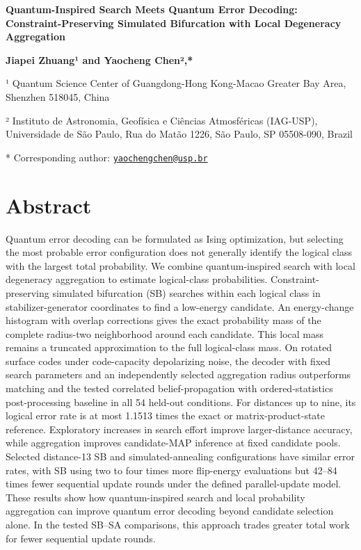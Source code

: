 \documentclass[
  10pt,
]{article}
\author{}
\date{}
\begin{document}
\begin{center}
{\LARGE\bfseries Quantum-Inspired Search Meets Quantum Error Decoding:
Constraint-Preserving Simulated Bifurcation with Local Degeneracy
Aggregation\par}
\end{center}

\begin{center}
\small
\textbf{Jiapei Zhuang¹ and Yaocheng Chen²,*}

¹ Quantum Science Center of Guangdong-Hong Kong-Macao Greater Bay Area,
Shenzhen 518045, China

² Instituto de Astronomia, Geofísica e Ciências Atmosféricas (IAG-USP),
Universidade de São Paulo, Rua do Matão 1226, São Paulo, SP 05508-090,
Brazil

* Corresponding author:
\href{mailto:yaochengchen@usp.br}{\nolinkurl{yaochengchen@usp.br}}

\end{center}

\section{Abstract}\label{abstract}

Quantum error decoding can be formulated as Ising optimization, but
selecting the most probable error configuration does not generally
identify the logical class with the largest total probability. We
combine quantum-inspired search with local degeneracy aggregation to
estimate logical-class probabilities. Constraint-preserving simulated
bifurcation (SB) searches within each logical class in
stabilizer-generator coordinates to find a low-energy candidate. An
energy-change histogram with overlap corrections gives the exact
probability mass of the complete radius-two neighborhood around each
candidate. This local mass remains a truncated approximation to the full
logical-class mass. On rotated surface codes under code-capacity
depolarizing noise, the decoder with fixed search parameters and an
independently selected aggregation radius outperforms matching and the
tested correlated belief-propagation with ordered-statistics
post-processing baseline in all 54 held-out conditions. For distances up
to nine, its logical error rate is at most 1.1513 times the exact or
matrix-product-state reference. Exploratory increases in search effort
improve larger-distance accuracy, while aggregation improves
candidate-MAP inference at fixed candidate pools. Selected distance-13
SB and simulated-annealing configurations have similar error rates, with
SB using two to four times more flip-energy evaluations but 42--84 times
fewer sequential update rounds under the defined parallel-update model.
These results show how quantum-inspired search and local probability
aggregation can improve quantum error decoding beyond candidate
selection alone. In the tested SB--SA comparisons, this approach trades
greater total work for fewer sequential update rounds.
\end{document}
